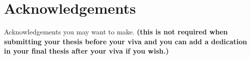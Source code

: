 \section*{\centering Acknowledgements}

Acknowledgements you may want to make. \textbf{(this is not required when submitting your thesis before your viva and you can add a dedication in your final thesis after your viva if you wish.)}